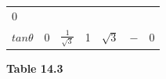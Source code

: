 {{\begin{center}
\begin{xtabular}[t]{|l|l|l|l|l|l|l|}
        0%
     \tabularnewline{}
                $tan\theta $
               &
        0 &
                $\frac{1}{\sqrt{3}}$
               &
        1 &
                $\sqrt{3}$
               &
                $-$
               &
        0%
     \tabularnewline{}
    \end{xtabular}
      \end{center}
    \begin{center}{\small\bfseries Table 14.3}\end{center}
          } %
        }{%
        }
